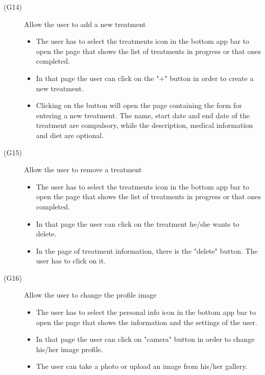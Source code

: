 \documentclass [12pt]{article}
\begin{document}
\begin{description}
\item[(G14)]Allow the user to add a new treatment 
\begin{itemize}
\item The user has to select the treatments icon in the bottom app bar to open the page that shows the list of treatments in progress or that ones completed.  
\item In that page the user can click on the "+" button in order to create a new treatment.
\item Clicking on the button will open the page containing the form for entering a new treatment. The name, start date and end date of the treatment are compulsory, while the description, medical information and diet are optional.
\end{itemize}
\end{description}

\begin{description}
\item[(G15)]Allow the user to remove a treatment 
\begin{itemize}
\item The user has to select the treatments icon in the bottom app bar to open the page that shows the list of treatments in progress or that ones completed.  
\item In that page the user can click on the treatment he/she wants to delete.
\item In the page of treatment information, there is the "delete" button. The user has to click on it.
\end{itemize}
\end{description}

\clearpage

\begin{description}
\item[(G16)]Allow the user to change the profile image 
\begin{itemize}
\item The user has to select the personal info icon in the bottom app bar to open the page that shows the information and the settings of the user.  
\item In that page the user can click on "camera" button in order to change his/her image profile.
\item The user can take a photo or upload an image from his/her gallery.
\end{itemize}
\end{description}
\end{document}
